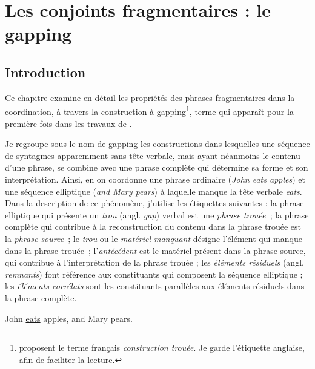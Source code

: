 \chapter{Les conjoints fragmentaires : le gapping} \label{ch2}
\section{Introduction}
\largerpage[2]
Ce chapitre examine en détail les propriétés des phrases fragmentaires dans la coordination, à travers la construction à gapping\footnote{
 \citet{AbeilleEtAl2010} proposent le terme français \textit{construction trouée}. Je garde l’étiquette anglaise, afin de faciliter la lecture.}, terme qui apparaît pour la première fois dans les travaux de \citet{Ross1967,Ross1970}.

Je regroupe sous le nom de gapping les constructions dans lesquelles une séquence de syntagmes apparemment sans tête verbale, mais ayant néanmoins le conte\-nu d’une phrase, se combine avec une phrase complète qui détermine sa forme et son interprétation. Ainsi, en  on coordonne une phrase ordinaire (\textit{John eats apples}) et une séquence elliptique (\textit{and Mary pears}) à laquelle manque la tête verbale \textit{eats}. Dans la description de ce phénomène, j’utilise les étiquettes suivantes : la phrase elliptique qui présente un \textit{trou} (angl. \textit{gap}) verbal est une \textit{phrase trouée~}; la phrase complète qui contribue à la reconstruction du contenu dans la phrase trouée est la \textit{phrase source~}; le \textit{trou} ou le \textit{matériel manquant} désigne l’élément qui manque dans la phrase trouée\textit{~}; l’\textit{antécédent} est le matériel présent dans la phrase source, qui contribue à l’interprétation de la phrase trouée ; les \textit{éléments résiduels} (angl. \textit{remnants}) font référence aux constituants qui composent la séquence elliptique ; les \textit{éléments corrélats} sont les constituants parallèles aux éléments résiduels dans la phrase complète. 

\ea
John \uline{eats} apples, and Mary pears. \label{ch2:ex1} 
\z


